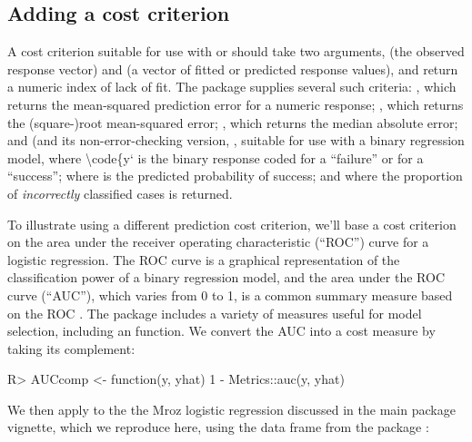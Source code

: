 \documentclass[
]{jss}
\begin{document}
\hypertarget{adding-a-cost-criterion}{%
\subsection{Adding a cost criterion}\label{adding-a-cost-criterion}}

A cost criterion suitable for use with  or 
should take two arguments,  (the observed response vector) and
 (a vector of fitted or predicted response values), and
return a numeric index of lack of fit. The  package supplies
several such criteria: , which returns the
mean-squared prediction error for a numeric response;
, which returns the (square-)root mean-squared
error; , which returns the median absolute
error; and  (and its non-error-checking
version, , suitable for use with a binary
regression model, where \textbackslash code\{y` is the binary response
coded  for a ``failure'' or  for a ``success''; where
 is the predicted probability of success; and where the
proportion of \emph{incorrectly} classified cases is returned.

To illustrate using a different prediction cost criterion, we'll base a
cost criterion on the area under the receiver operating characteristic
(``ROC'') curve for a logistic regression. The ROC curve is a graphical
representation of the classification power of a binary regression model,
and the area under the ROC curve (``AUC''), which varies from 0 to 1, is
a common summary measure based on the ROC
\citep[see][]{Wikipedia-ROC:2023}. The  package
\citep{HamnerFrasco:2018} includes a variety of measures useful for
model selection, including an  function. We convert the AUC
into a cost measure by taking its complement:

\begin{CodeChunk}
\begin{CodeInput}
R> AUCcomp <- function(y, yhat) 1 - Metrics::auc(y, yhat)
\end{CodeInput}
\end{CodeChunk}

We then apply  to the the Mroz logistic regression
discussed in the main  package vignette, which we reproduce
here, using the  data frame from the  package
\citep{FoxWeisberg:2019}:
\end{document}
